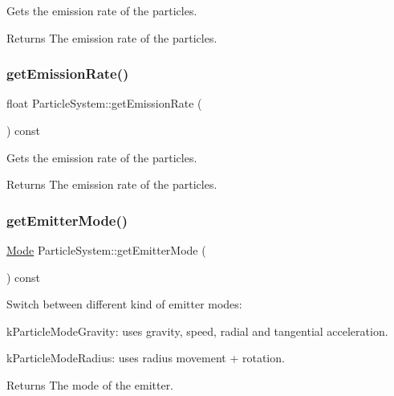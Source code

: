 Gets the emission rate of the particles.

\begin{DoxyReturn}{Returns}
The emission rate of the particles. 
\end{DoxyReturn}
\mbox{\label{classParticleSystem_af869c4ac393b207ffaf32a3f8f9de80e}} 
\subsubsection{\texorpdfstring{get\+Emission\+Rate()}{getEmissionRate()}\hspace{0.1cm}{\footnotesize\ttfamily [2/2]}}
{\footnotesize\ttfamily float Particle\+System\+::get\+Emission\+Rate (\begin{DoxyParamCaption}{ }\end{DoxyParamCaption}) const\hspace{0.3cm}{\ttfamily [inline]}}

Gets the emission rate of the particles.

\begin{DoxyReturn}{Returns}
The emission rate of the particles. 
\end{DoxyReturn}
\mbox{\label{classParticleSystem_aa2fb0ce7062690746cd376dcddaac3bb}} 
\subsubsection{\texorpdfstring{get\+Emitter\+Mode()}{getEmitterMode()}\hspace{0.1cm}{\footnotesize\ttfamily [1/2]}}
{\footnotesize\ttfamily \hyperlink{classParticleSystem_aa380bd1c6062c44d56268a61ade9c8fb}{Mode} Particle\+System\+::get\+Emitter\+Mode (\begin{DoxyParamCaption}{ }\end{DoxyParamCaption}) const\hspace{0.3cm}{\ttfamily [inline]}}

Switch between different kind of emitter modes\+:
\begin{DoxyItemize}
\item k\+Particle\+Mode\+Gravity\+: uses gravity, speed, radial and tangential acceleration.
\item k\+Particle\+Mode\+Radius\+: uses radius movement + rotation.

\begin{DoxyReturn}{Returns}
The mode of the emitter. 
\end{DoxyReturn}

\end{DoxyItemize}\mbox{\label{classParticleSystem_aa2fb0ce7062690746cd376dcddaac3bb}} 
